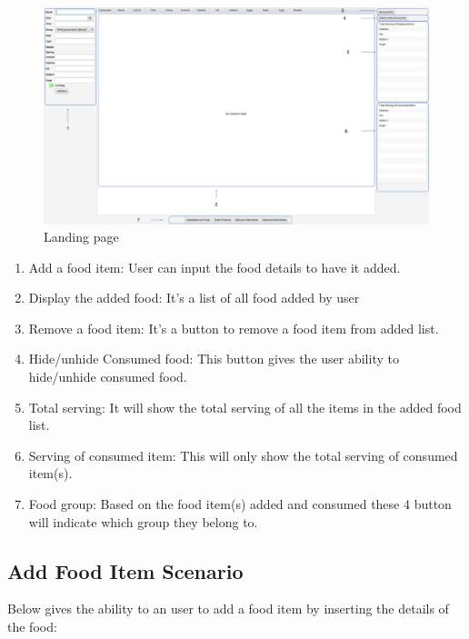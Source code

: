 \documentclass{scrreprt}
\begin{document}
\begin{figure}[!htbp]
	\centering
	\includegraphics[width=15cm]{pictures/raw.png}
	\caption{Landing page}
\end{figure}
\FloatBarrier
\begin{enumerate}
	\item Add a food item: User can input the food details to have it added.
	\item Display the added food: It's a list of all food added by user
	\item Remove a food item: It's a button to remove a food item from added list.
	\item Hide/unhide Consumed food: This button gives the user ability to hide/unhide consumed food.
	\item Total serving: It will show the total serving of all the items in the added food list.
	\item Serving of consumed item: This will only show the total serving of consumed item(s).
	\item Food group: Based on the food item(s) added and consumed these 4 button will indicate which group they belong to.
\end{enumerate}
	
\subsection{Add Food Item Scenario}

Below gives the ability to an user to add a food item by inserting the details of the food:
\end{document}

